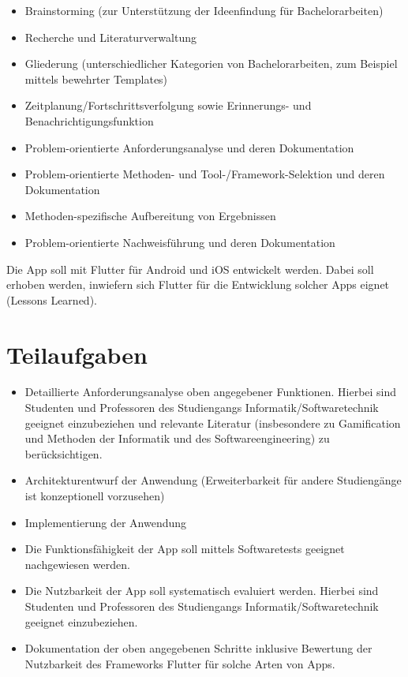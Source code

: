 \documentclass[bibliography=totoc,listof=totoc,BCOR=5mm,DIV=12,oneside]{scrbook}
\begin{document}
\begin{itemize}
\item Brainstorming (zur Unterstützung der Ideenfindung für Bachelorarbeiten)
\item Recherche und Literaturverwaltung
\item Gliederung (unterschiedlicher Kategorien von Bachelorarbeiten, zum Beispiel mittels bewehrter Templates)
\item Zeitplanung/Fortschrittsverfolgung sowie Erinnerungs- und Benachrichtigungsfunktion 
\item Problem-orientierte Anforderungsanalyse und deren Dokumentation
\item Problem-orientierte Methoden- und Tool-/Framework-Selektion und deren Dokumentation
\item Methoden-spezifische Aufbereitung von Ergebnissen
\item Problem-orientierte Nachweisführung und deren Dokumentation
\end{itemize}
\par Die App soll mit Flutter für Android und iOS entwickelt werden. Dabei soll erhoben werden, inwiefern sich Flutter für die Entwicklung solcher Apps eignet (Lessons Learned).

\section*{Teilaufgaben}
\begin{itemize}
\item Detaillierte Anforderungsanalyse oben angegebener Funktionen. Hierbei sind Studenten und Professoren des Studiengangs Informatik/Softwaretechnik geeignet einzubeziehen und relevante Literatur (insbesondere zu Gamification und Methoden der Informatik und des Softwareengineering) zu berücksichtigen.
\item Architekturentwurf der Anwendung (Erweiterbarkeit für andere Studiengänge ist konzeptionell vorzusehen)
\item Implementierung der Anwendung
\item Die Funktionsfähigkeit der App soll mittels Softwaretests geeignet nachgewiesen werden.
\item Die Nutzbarkeit der App soll systematisch evaluiert werden. Hierbei sind Studenten und Professoren des Studiengangs Informatik/Softwaretechnik geeignet einzubeziehen.
\item Dokumentation der oben angegebenen Schritte inklusive Bewertung der Nutzbarkeit des Frameworks Flutter für solche Arten von Apps.
\end{itemize}
\end{document}
